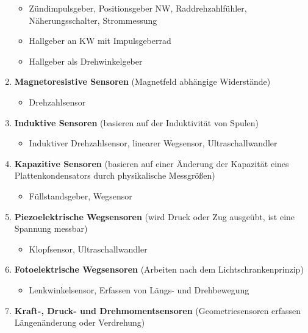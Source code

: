 \begin{enumerate}
  \begin{itemize}
  \item
    Zündimpulsgeber, Positionsgeber NW, Raddrehzahlfühler,
    Näherungsschalter, Strommessung
  \item
    Hallgeber an KW mit Impulsgeberrad
  \item
    Hallgeber als Drehwinkelgeber
  \end{itemize}
\item
  \textbf{Magnetoresistive Sensoren} (Magnetfeld abhängige Widerstände)

  \begin{itemize}
  \item
    Drehzahlsensor
  \end{itemize}
\item
  \textbf{Induktive Sensoren} (basieren auf der Induktivität von Spulen)

  \begin{itemize}
  \item
    Induktiver Drehzahlsensor, linearer Wegsensor, Ultraschallwandler
  \end{itemize}
\item
  \textbf{Kapazitive Sensoren} (basieren auf einer Änderung der
  Kapazität eines Plattenkondensators durch physikalische Messgrößen)

  \begin{itemize}
  \item
    Füllstandsgeber, Wegsensor
  \end{itemize}
\item
  \textbf{Piezoelektrische Wegsensoren} (wird Druck oder Zug ausgeübt,
  ist eine Spannung messbar)

  \begin{itemize}
  \item
    Klopfsensor, Ultraschallwandler
  \end{itemize}
\item
  \textbf{Fotoelektrische Wegsensoren} (Arbeiten nach dem
  Lichtschrankenprinzip)

  \begin{itemize}
  \item
    Lenkwinkelsensor, Erfassen von Längs- und Drehbewegung
  \end{itemize}
\item
  \textbf{Kraft-, Druck- und Drehmomentsensoren} (Geometriesensoren
  erfassen Längenänderung oder Verdrehung)


\end{enumerate}
